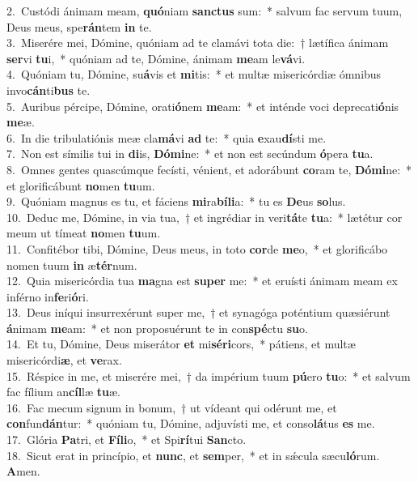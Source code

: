 {2.~}Custódi ánimam meam, \textbf{quó}niam \textbf{san}\textbf{ctus} sum:~* salvum fac servum tuum, Deus meus, spe\textbf{rán}tem \textbf{in} te.\\
{3.~}Miserére mei, Dómine, quóniam ad te clamávi tota die:~† lætífica ánimam \textbf{ser}vi \textbf{tu}i,~* quóniam ad te, Dómine, ánimam \textbf{me}am le\textbf{vá}vi.\\
{4.~}Quóniam tu, Dómine, su\textbf{á}vis et \textbf{mi}tis:~* et multæ misericórdiæ ómnibus invo\textbf{cán}ti\textbf{bus} te.\\
{5.~}Auribus pércipe, Dómine, orati\textbf{ó}nem \textbf{me}am:~* et inténde voci deprecati\textbf{ó}nis \textbf{me}æ.\\
{6.~}In die tribulatiónis meæ cla\textbf{má}vi \textbf{ad} te:~* quia \textbf{e}xau\textbf{dí}sti me.\\
{7.~}Non est símilis tui in \textbf{di}is, \textbf{Dó}\textbf{mi}ne:~* et non est secúndum \textbf{ó}pera \textbf{tu}a.\\
{8.~}Omnes gentes quascúmque fecísti, vénient, et adorábunt \textbf{co}ram te, \textbf{Dó}\textbf{mi}ne:~* et glorificábunt \textbf{no}men \textbf{tu}um.\\
{9.~}Quóniam magnus es tu, et fáciens \textbf{mi}ra\textbf{bí}\textbf{li}a:~* tu es \textbf{De}us \textbf{so}lus.\\
{10.~}Deduc me, Dómine, in via tua,~† et ingrédiar in veri\textbf{tá}te \textbf{tu}a:~* lætétur cor meum ut tímeat \textbf{no}men \textbf{tu}um.\\
{11.~}Confitébor tibi, Dómine, Deus meus, in toto \textbf{cor}de \textbf{me}o,~* et glorificábo nomen tuum \textbf{in} æ\textbf{tér}num.\\
{12.~}Quia misericórdia tua \textbf{ma}gna est \textbf{su}\textbf{per} me:~* et eruísti ánimam meam ex inférno in\textbf{fe}ri\textbf{ó}ri.\\
{13.~}Deus iníqui insurrexérunt super me,~† et synagóga poténtium quæsiérunt \textbf{á}nimam \textbf{me}am:~* et non proposuérunt te in con\textbf{spé}ctu \textbf{su}o.\\
{14.~}Et tu, Dómine, Deus miserátor \textbf{et} mi\textbf{sé}\textbf{ri}cors,~* pátiens, et multæ misericórdi\textbf{æ}, et \textbf{ve}rax.\\
{15.~}Réspice in me, et miserére mei,~† da impérium tuum \textbf{pú}ero \textbf{tu}o:~* et salvum fac fílium an\textbf{cíl}læ \textbf{tu}æ.\\
{16.~}Fac mecum signum in bonum,~† ut vídeant qui odérunt me, et \textbf{con}fun\textbf{dán}tur:~* quóniam tu, Dómine, adjuvísti me, et conso\textbf{lá}tus \textbf{es} me.\\
{17.~}Glória \textbf{Pa}tri, et \textbf{Fí}\textbf{li}o,~* et Spi\textbf{rí}tui \textbf{San}cto.\\
{18.~}Sicut erat in princípio, et \textbf{nunc}, et \textbf{sem}per,~* et in sǽcula sæcu\textbf{ló}rum. \textbf{A}men.\\
